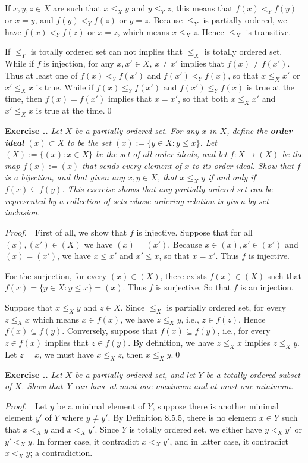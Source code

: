 \documentclass{book}
\newcommand{\pff}{\vspace{.25em}\noindent\emph{Proof.}~~}
\newcounter{Exercise}[section]
\renewcommand{\theExercise}{\thesection.\arabic{Exercise}.}
\newcommand{\new}{\vspace{1.5em}\noindent\textbf{{Exercise \stepcounter{Exercise}\textbf{\theExercise}}} }
\begin{document}
If $x,y,z\in X$ are such that $x\leq_X y$ and $y\leq_Y z$, this means that $f(x)<_Y f(y)$ or $x=y$, and $f(y)<_Y f(z)$ or $y=z$. Because $\leq_Y$ is partially ordered, we have $f(x)<_Y f(z)$ or $x=z$, which means $x\leq_X z$. Hence $\leq_X$ is transitive.

If $\leq_Y$ is totally ordered set can not implies that $\leq_X$ is totally ordered set. While if $f$ is injection, for any $x,x'\in X$, $x\neq x'$ implies that $f(x)\neq f(x')$. Thus at least one of $f(x)<_Y f(x')$ and $f(x')<_Y f(x)$, so that $x\leq_X x'$ or $x'\leq_X x$ is true. While if $f(x)\leq_Y f(x')$ and $f(x')\leq_Y f(x)$ is true at the time, then $f(x)=f(x')$ implies that $x=x'$, so that both $x\leq_X x'$ and $x'\leq_X x$ is true at the time.\qed

\new\emph{Let $X$ be a partially ordered set. For any $x$ in $X$, define the \textbf{order ideal} $(x)\subset X$ to be the set $(x):=\{y\in X:y\leq x\}$. Let $(X):=\{(x):x\in X\}$ be the set of all order ideals, and let $f: X\to(X)$ be the map $f(x):=(x)$ that sends every element of $x$ to its order ideal. Show that $f$ is a bijection, and that given any $x,y\in X$, that $x\leq_X y$ if and only if $f(x)\subseteq f(y)$. This exercise shows that any partially ordered set can be represented by a collection of sets whose ordering relation is given by set inclusion.}

\pff First of all, we show that $f$ is injective. Suppose that for all $(x),(x')\in (X)$ we have $(x)=(x')$. Because $x\in (x),x'\in (x')$ and $(x)=(x')$, we have $x\leq x'$ and $x'\leq x$, so that $x=x'$. Thus $f$ is injective.

For the surjection, for every $(x)\in (X)$, there exists $f(x)\in(X)$ such that $f(x)=\{y\in X:y\leq x\}=(x)$. Thus $f$ is surjective. So that $f$ is an injection.

Suppose that $x\leq_X y$ and $z\in X$. Since $\leq_X$ is partially ordered set, for every $z\leq_X x$ which means $x\in f(x)$, we have $z\leq_X y$, i.e., $z\in f(z)$. Hence $f(x)\subseteq f(y)$. Conversely, suppose that $f(x)\subseteq f(y)$, i.e., for every $z\in f(x)$ implies that $z\in f(y)$. By definition, we have $z\leq_X x$ implies $z\leq_X y$. Let $z=x$, we must have $x\leq_X z$, then $x\leq_X y$.\qed

\new\emph{Let $X$ be a partially ordered set, and let $Y$ be a totally ordered subset of $X$. Show that Y can have at most one maximum and at most one minimum.}

\pff Let $y$ be a minimal element of $Y$, suppose there is another minimal element $y'$ of $Y$ where $y\neq y'$. By Definition 8.5.5, there is no element $x\in Y$ such that $x<_X y$ and $x<_X y'$. Since $Y$ is totally ordered set, we either have $y<_X y'$ or $y'<_X y$. In former case, it contradict $x<_X y'$, and in latter case, it contradict $x<_X y$; a contradiction.
\end{document}
